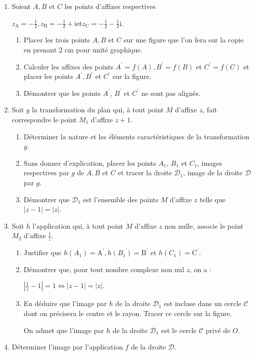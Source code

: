 \begin{enumerate}
     \item
     Soient $A, B$ et $C$ les points d'affixes respectives
     \par
     $z_{\text{A}}=-\frac{1}{2},   z_{\text{B}}=-\frac{1}{2}+\text{i} $et$   z_{\text{C}}=-\frac{1}{2}-\frac{1}{2} \text{i}.$
     \begin{enumerate}[label=\alph*.]
          \item
          Placer les trois points $A, B$ et $C$ sur une figure que l'on fera sur la copie en prenant 2 cm pour unité graphique.
          \item
          Calculer les affixes des points $A^{\prime} = f\left(A\right),  B^{\prime} = f\left(B\right)$ et $C^{\prime} = f\left(C\right)$ et placer les points $A^{\prime}, B^{\prime}$ et $C^{\prime}$ sur la figure.
          \item
          Démontrer que les points $A^{\prime}$, $B^{\prime}$ et $C^{\prime}$ ne sont pas alignés.
     \end{enumerate}
     \item
     Soit $g$ la transformation du plan qui, à tout point $M$ d'affixe $z$, fait correspondre le point $M_{1}$ d'affixe $z + 1$.
     \begin{enumerate}[label=\alph*.]
          \item
          Déterminer la nature et les éléments caractéristiques de la transformation $g$.
          \item
          Sans donner d'explication, placer les points $A_{1}$, $B_{1}$ et $C_{1}$, images respectives par $g$ de $A, B$ et $C$ et tracer la droite $\mathscr D_{1}$, image de la droite $\mathscr D$ par $g$.
          \item
          Démontrer que $\mathscr D_{1}$ est l'ensemble des points $M$ d'affixe $z$ telle que $|z-1| = |z|$.
     \end{enumerate}
     \item
     Soit $h$ l'application qui, à tout point $M$ d'affixe $z$ non nulle, associe le point $M_{2}$ d'affixe $\frac{1}{z}$.
     \begin{enumerate}[label=\alph*.]
          \item
          Justifier que $h\left(A_{1}\right) = \text{A}^{\prime}, h\left(B_{1}\right) = \text{B}^{\prime}$ et $h \left(C_{1}\right) = \text{C}^{\prime}$.
          \item
          Démontrer que, pour tout nombre complexe non nul $z$, on a :
          \par
          $  \left| \frac{1}{z}-1\right|= 1 \Leftrightarrow   |z-1| = |z|.$
          \item
          En déduire que l'image par $h$ de la droite $\mathscr D_{1}$ est incluse dans un cercle $\mathscr C$ dont on précisera le centre et le rayon. Tracer ce cercle sur la figure.
          \par
          On admet que l'image par $h$ de la droite $\mathscr D_{1}$ est le cercle $\mathscr C$ privé de $O$.
     \end{enumerate}
     \item
     Déterminer l'image par l'application $f$ de la droite $\mathscr D$.
\end{enumerate}
